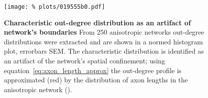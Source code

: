 \begin{figure}[H]
  \centering
  \texttt{[image: \%
    plots/019555b0.pdf]}
  \caption{\textbf{Characteristic out-degree distribution as an
      artifact of network's boundaries} From 250 anisotropic networks
    out-degree distributions were extracted and are shown in a normed
    histogram plot, errorbars SEM. The characteristic distribution is
    identified as an artifact of the network's spatial confinement;
    using equation~\ref{eq:axon_length_approx} the out-degree profile
    is approximated (red) by the distribution of axon lengths in the
    anisotropic network ().}
  \label{fig:out_degree_ER_compare}
\end{figure}


